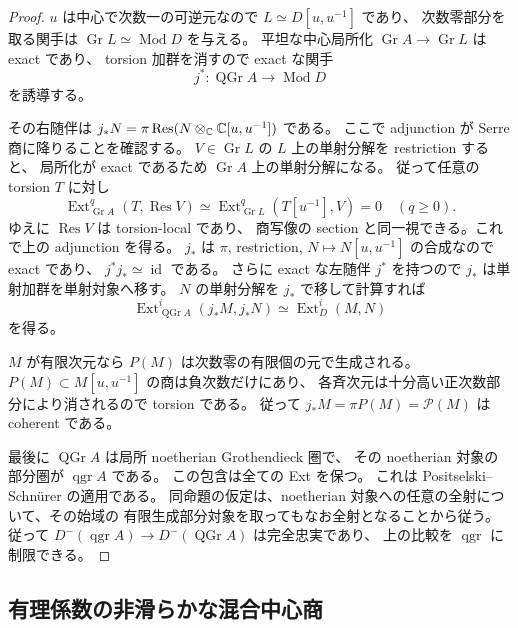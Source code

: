 \begin{proof}
$u$ は中心で次数一の可逆元なので $L\simeq D[u,u^{-1}]$ であり、
次数零部分を取る関手は $\operatorname{Gr}L\simeq\operatorname{Mod}D$ を与える。
平坦な中心局所化 $\operatorname{Gr}A\to\operatorname{Gr}L$ は exact であり、
torsion 加群を消すので exact な関手
\[
 j^*:\operatorname{QGr}A\longrightarrow\operatorname{Mod}D
\]
を誘導する。

その右随伴は
$j_*N=\pi\operatorname{Res}(N\otimes_\mathbb C\mathbb C[u,u^{-1}])$ である。
ここで adjunction が Serre 商に降りることを確認する。
$V\in\operatorname{Gr}L$ の $L$ 上の単射分解を restriction すると、
局所化が exact であるため $\operatorname{Gr}A$ 上の単射分解になる。
従って任意の torsion $T$ に対し
\[
 \operatorname{Ext}^q_{\operatorname{Gr}A}(T,\operatorname{Res}V)
 \simeq\operatorname{Ext}^q_{\operatorname{Gr}L}(T[u^{-1}],V)=0
 \quad(q\ge0).
\]
ゆえに $\operatorname{Res}V$ は torsion-local であり、
商写像の section と同一視できる。これで上の adjunction を得る。
$j_*$ は $\pi$, restriction, $N\mapsto N[u,u^{-1}]$ の合成なので exact であり、
$j^*j_*\simeq\operatorname{id}$ である。
さらに exact な左随伴 $j^*$ を持つので $j_*$ は単射加群を単射対象へ移す。
$N$ の単射分解を $j_*$ で移して計算すれば
\[
 \operatorname{Ext}^i_{\operatorname{QGr}A}(j_*M,j_*N)
 \simeq\operatorname{Ext}^i_D(M,N)
\]
を得る。

$M$ が有限次元なら $P(M)$ は次数零の有限個の元で生成される。
$P(M)\subset M[u,u^{-1}]$ の商は負次数だけにあり、
各斉次元は十分高い正次数部分により消されるので torsion である。
従って $j_*M=\pi P(M)=\mathcal P(M)$ は coherent である。

最後に $\operatorname{QGr}A$ は局所 noetherian Grothendieck 圏で、
その noetherian 対象の部分圏が $\operatorname{qgr}A$ である。
この包含は全ての Ext を保つ。
これは Positselski--Schn\"urer \cite[Proposition~2.1]{CMOSmallBig} の適用である。
同命題の仮定は、noetherian 対象への任意の全射について、その始域の
有限生成部分対象を取ってもなお全射となることから従う。
従って $D^-(\operatorname{qgr}A)\to D^-(\operatorname{QGr}A)$ は完全忠実であり、
上の比較を $\operatorname{qgr}$ に制限できる。
\end{proof}

\subsection{有理係数の非滑らかな混合中心商}

